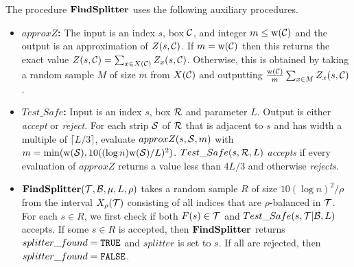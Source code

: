 \documentclass{acmsmall}
\newcommand{\cB}{{\cal B}}
\newcommand{\cC}{{\cal C}}
\newcommand{\cR}{{\cal R}}
\newcommand{\cS}{{\cal S}}
\newcommand{\cT}{{\cal T}}
\newcommand{\strip}[2]{#1|#2}
\newcommand{\width}{{\bf {\rm  w}}}
\newcommand{\findsplitter}{{\rm {\bf FindSplitter}}}
\newcommand{\splitterfound}{splitter\_found}
\begin{document}
The procedure $\findsplitter$ uses the following auxiliary procedures.
 
\begin{itemize}
\item {\bf $approxZ$:} The input is an index $s$, box $\cC$, and integer $m \leq \width(\cC)$
and the output is an approximation of $Z(s,\cC)$. If $m=\width(\cC)$ then this returns the exact
value $Z(s,\cC)=\sum_{x \in X(\cC)}Z_x(s,\cC)$.  Otherwise, this is obtained by taking a random sample $M$ of size $m$ from $X(\cC)$
and outputting $\frac{\width(\cC)}{m}\sum_{x \in M} Z_x(s,\cC)$.
\item {\bf $Test\_Safe$:} Input is an index $s$, box $\cR$ and parameter $L$. Output is either {\em accept} or {\em reject}.
For each strip
$\cS$ of $\cR$ that is adjacent to $s$ and has width a multiple of $\lceil L/3 \rceil$, evaluate $approxZ(s,\cS,m)$
with $m = \min(\width(\cS),10((\log n)\width(\cS)/L)^2)$.  $Test\_Safe(s,\cR,L)$ \emph{accepts} if every evaluation of $approxZ$ returns a value
less than $4L/3$ and otherwise {\em rejects}.
\item  $\findsplitter(\cT,\cB,\mu,L,\rho)$ takes a random sample $R$ of size $10(\log n)^2/\rho$ 
from  the interval $X_{\rho}(\cT)$ consisting of all indices that are $\rho$-balanced in $\cT$.
For each $s \in R$, we first check if both $F(s) \in \cT$ and $Test\_Safe(s,\strip{\cT}{\cB},L)$ accepts.  If some $s \in R$
is accepted, then
$\findsplitter$ returns $\splitterfound={\tt TRUE}$ and $splitter$ is set to $s$.  If all are rejected,
then $\splitterfound={\tt FALSE}$.
\end{itemize}
\end{document}
